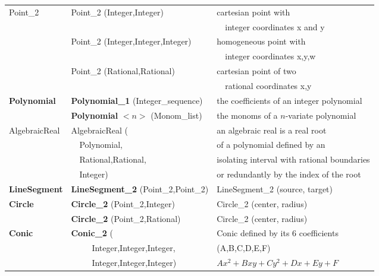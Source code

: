 \begin{ccTexOnly}
\begin{tabular}{*{3}{| l} |}
Point\_2 & Point\_2 (Integer,Integer)     & cartesian point with \\
         &                                & \ \ integer coordinates x and y \\
         & Point\_2 (Integer,Integer,Integer) & homogeneous point with \\ 
         &                                & \ \ integer coordinates x,y,w\\
         & Point\_2 (Rational,Rational)   & cartesian point of two \\
         &                                & \ \ rational coordinates x,y\\ \hline
{\bf Polynomial}    & {\bf Polynomial\_1} (Integer\_sequence) 
                             & the coefficients of an integer polynomial \\ \hline
                    & {\bf Polynomial} $<n>$ (Monom\_list)
                             & the monoms of a $n$-variate polynomial \\ \hline

AlgebraicReal & AlgebraicReal (         & an algebraic real is a real root\\
              & \ \ Polynomial,         & of a polynomial defined by an\\
              & \ \ Rational,Rational,  & isolating interval with rational boundaries\\
              & \ \ Integer)            & or redundantly by the index of the root\\ \hline

{\bf LineSegment} & {\bf LineSegment\_2} (Point\_2,Point\_2) & LineSegment\_2 (source, target) \\ \hline

{\bf Circle}   & {\bf Circle\_2} (Point\_2,Integer) & Circle\_2 (center, radius) \\ 
               & {\bf Circle\_2} (Point\_2,Rational) & Circle\_2 (center, radius) \\ \hline

{\bf Conic}  & {\bf Conic\_2} (
                               & Conic defined by its 6 coefficients \\
             & \ \ \ \ \ Integer,Integer,Integer,
                     &  (A,B,C,D,E,F) \\
             & \ \ \ \ \ Integer,Integer,Integer)        
                     &  \begin{math} Ax^2+Bxy+Cy^2+Dx+Ey+F \end{math}\\ \hline


\end{tabular}
\end{ccTexOnly}
